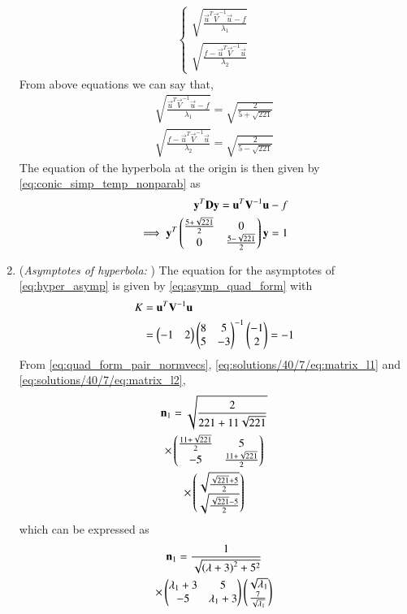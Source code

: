 \begin{enumerate}
\begin{align}
\begin{cases}
\sqrt{\frac{\vec{u}^T\vec{V}^{-1}\vec{u}-f}{\lambda_1}}\\ \sqrt{\frac{f-\vec{u}^T\vec{V}^{-1}\vec{u}}{\lambda_2}}
\end{cases}
\end{align}
From above equations we can say that,
\begin{align}
\sqrt{\frac{\vec{u}^T\vec{V}^{-1}\vec{u}-f}{\lambda_1}}=\sqrt{ \frac{2}{5+\sqrt{221}}}\\
\sqrt{\frac{f-\vec{u}^T\vec{V}^{-1}\vec{u}}{\lambda_2}}=\sqrt{ \frac{2}{5-\sqrt{221}}}
\end{align}
The equation of the hyperbola at the origin is then given by \eqref{eq:conic_simp_temp_nonparab} as
\begin{align}
    \mathbf{y}^T\mathbf{D}\mathbf{y}=\mathbf{u}^T\mathbf{V}^{-1}\mathbf{u}-f\label{eq:solutions/40/7/eq:es71/fi}
\\
   \implies\mathbf{y}^T\begin{pmatrix}\frac{5+\sqrt{221}}{2} & 0 \\0 & \frac{5-\sqrt{221}}{2}\end{pmatrix}\mathbf{y}= 1
\end{align}
\item ({\em Asymptotes of hyperbola: })
The equation for the asymptotes of \eqref{eq:hyper_asymp} is given by \eqref{eq:asymp_quad_form} with 
\begin{align} 
K &=  \mathbf{u}^T\mathbf{V}^{-1}\mathbf{u}
\\
&=   \begin{pmatrix}-1 & 2 \end{pmatrix}  \begin{pmatrix}8 & 5 \\ 5 &-3\end{pmatrix}^{-1}\begin{pmatrix}-1 \\2 \end{pmatrix}
 =-1
\label{eq:quad_form_asymp_condK}
\end{align}
%
From \eqref{eq:quad_form_pair_normvecs}, \eqref{eq:solutions/40/7/eq:matrix_l1} and \eqref{eq:solutions/40/7/eq:matrix_l2},
%
\begin{multline}
\mathbf{n}_1 =  \sqrt{\frac{2}{221+11\sqrt{221}}}
\\
\times \begin{pmatrix} \frac{11+\sqrt{221}}{2} & 5  \\ -5 & \frac{11+\sqrt{221}}{2}\end{pmatrix}
\\
\times \begin{pmatrix}\sqrt{\frac{\sqrt{221}+5}{2}} \\  \sqrt{\frac{\sqrt{221}-5}{2}}\end{pmatrix}
\end{multline}
%
which can be expressed as
%
\begin{multline}
\vec{n}_1 = 
 \frac{1}{\sqrt{\brak{\lambda+3}^2+5^2}}
\\
\times \myvec{ \lambda_1+3 & 5  \\ -5 & \lambda_1+3}
\myvec{\sqrt{\lambda_1} \\  \frac{7}{\sqrt{\lambda_1}}}

\end{multline}
\end{enumerate}
